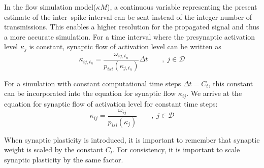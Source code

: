 	In the flow simulation model($\kappa M$), a continuous variable representing the present estimate of the inter--spike interval can be sent instead of the integer number of transmissions. 
	This enables a higher resolution for the propagated signal and thus a more accurate simulation.
	For a time interval where the presynaptic activation level $\kappa_j$ is constant, synaptic flow of activation level can be written as
	\begin{equation}
		\kappa_{ij, t_n} = \frac{ \omega_{ij, t_n} }{ p_{isi}(\kappa_{j, t_n}) } \Delta t \qquad,\; j\in\mathscr{D}%
	\end{equation}

	For a simulation with constant computational time steps $\Delta t = C_t$, this constant can be incorporated into the equation for synaptic flow $\kappa_{ij}$.
	We arrive at the equation for synaptic flow of activation level for constant time steps:
	\begin{equation}
		\kappa_{ij} = \frac{ \omega_{ij} }{ p_{isi}(\kappa_{j})} \qquad,\;j\in\mathscr{D}
		\label{eqSynapticTransmissionForKANN}
	\end{equation}
	
	When synaptic plasticity is introduced, it is important to remember that synaptic weight is scaled by the constant $C_t$.
	For consistency, it is important to scale synaptic plasticity by the same factor.




